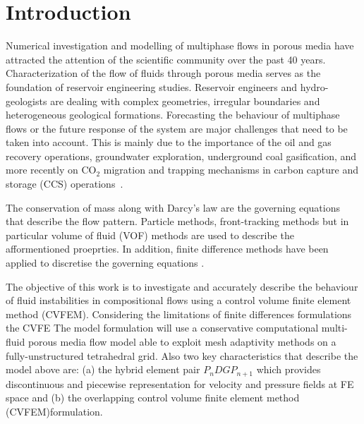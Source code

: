 \documentclass[preprint,authoryear,12pt]{elsarticle}
\begin{document}

\clearpage

\section{Introduction}\label{section:Intro}

Numerical investigation and modelling of multiphase flows in porous media have attracted the attention of the scientific community over the past 40 years. Characterization of the flow of fluids through porous media serves as the foundation of reservoir engineering studies. Reservoir engineers and hydro-geologists are dealing with complex geometries, irregular boundaries and heterogeneous geological formations. Forecasting the behaviour of multiphase flows or the future response of the system are major challenges that need to be taken into account.  This is mainly due to the importance of the oil and gas recovery operations, groundwater exploration, underground coal gasification, and more recently on CO$_{\text{2}}$ migration and trapping mechanisms in carbon capture and storage (CCS) operations~\citep{spycher_2003, chen_2006, self_2012, pruess_1990c, white_1981,jiang_2011}.

\medskip

The conservation of mass along with Darcy's law are the governing equations that describe the flow pattern. Particle methods, front-tracking methods \citep{univerdi_1992} but in particular volume of fluid (VOF) methods \citep{hirt_1981,rider_1998} are used to describe the afformentioned proeprties. In addition, finite difference methods have been applied to discretise the governing equations \citep{Luo2016,Moortgat2016,Hoteit2008} .

The objective of this work is to investigate and accurately describe the behaviour of fluid instabilities in compositional flows using a control volume finite element method (CVFEM). Considering the limitations of finite differences formulations the CVFE The model formulation will use a conservative computational multi-fluid porous media flow model able to exploit mesh adaptivity methods on a fully-unstructured tetrahedral grid. Also two key characteristics that describe the model above are: (a) the hybrid element pair $P_{n}DGP_{n+1}$ which provides discontinuous and piecewise representation for velocity and pressure fields at FE space and (b) the overlapping control volume finite element method (CVFEM)formulation.
\end{document}
